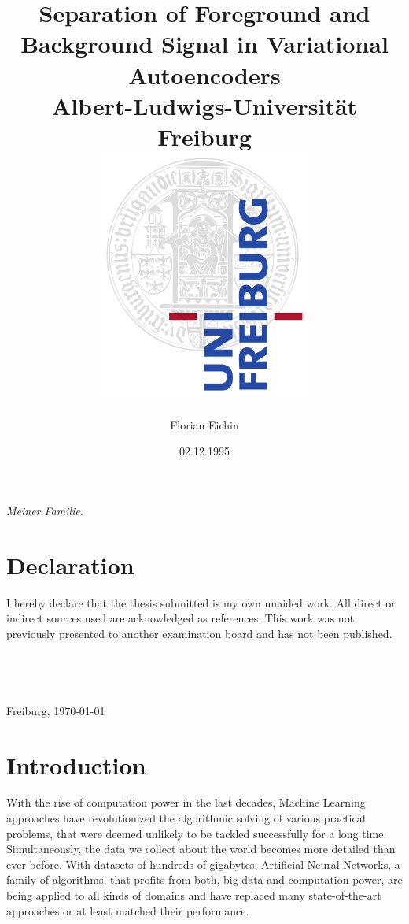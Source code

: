 \documentclass[12pt]{report}
\title{
{Separation of Foreground and Background Signal in Variational Autoencoders}\\
{\large Albert-Ludwigs-Universität Freiburg}\\[\baselineskip]
{\includegraphics[width=7cm]{logo.png}}
}
\author{Florian Eichin}
\date{02.12.1995}
\theoremstyle{definition}
\begin{document}
\maketitle

\leavevmode\thispagestyle{empty}\newpage

\begin{center}
\vspace*{\fill}
\emph{Meiner Familie.}
\vspace*{\fill}
\end{center}

\leavevmode\thispagestyle{empty}\newpage

\leavevmode\thispagestyle{empty}\newpage

\chapter*{Declaration}
I hereby declare that the thesis submitted is my own unaided work. All direct or indirect sources used are acknowledged as references. This work was not previously presented to another examination board and has not been published. \\ \\ \\ \\ \\

Freiburg, \today



\tableofcontents

\chapter{Introduction}
With the rise of computation power in the last decades, Machine Learning approaches have revolutionized the algorithmic solving of various practical problems, that were deemed unlikely to be tackled successfully for a long time. Simultaneously, the data we collect about the world becomes more detailed than ever before. With datasets of hundreds of gigabytes, Artificial Neural Networks, a family of algorithms, that profits from both, big data and computation power, are being applied to all kinds of domains and have replaced many state-of-the-art approaches or at least matched their performance.
\end{document}
